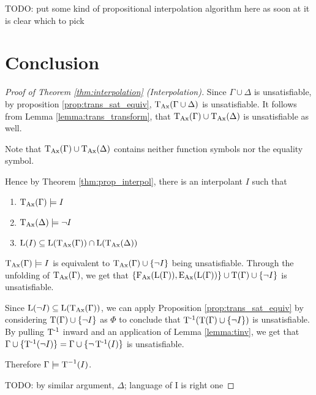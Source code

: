 TODO: put some kind of propositional interpolation algorithm here as soon at it is clear which to pick





\section{Conclusion}

\begin{proof}[Proof of Theorem \ref{thm:interpolation} (Interpolation)]
	Since $\Gamma \cup \Delta$ is unsatisfiable,
	by proposition \ref{prop:trans_sat_equiv}, $\operatorname{\operatorname{T}_{Ax}}(\Gamma \cup \Delta)$ is unsatisfiable.
	It follows from Lemma \ref{lemma:trans_transform}, that $\operatorname{\operatorname{T}_{Ax}}(\Gamma) \cup \operatorname{\operatorname{T}_{Ax}}(\Delta)$ is unsatisfiable as well.


	Note that $\operatorname{\operatorname{T}_{Ax}}(\Gamma) \cup \operatorname{\operatorname{T}_{Ax}}(\Delta)$ contains neither function symbols nor the equality symbol.

	Hence by Theorem \ref{thm:prop_interpol}, there is an interpolant $I$ such that
	\begin{enumerate}
	\item $\operatorname{\operatorname{T}_{Ax}}(\Gamma) \models I$
	\item $\operatorname{\operatorname{T}_{Ax}}(\Delta) \models \lnot I$ 
	\item $\operatorname{L}(I) \subseteq \operatorname{L}(\operatorname{\operatorname{T}_{Ax}}(\Gamma)) \cap \operatorname{L}(\operatorname{\operatorname{T}_{Ax}}(\Delta))$
	\end{enumerate}

	$\operatorname{\operatorname{T}_{Ax}}(\Gamma) \models I$ is equivalent to $\operatorname{\operatorname{T}_{Ax}}(\Gamma) \cup \{\lnot I\}$ being unsatisfiable.
	Through the unfolding of $\operatorname{\operatorname{T}_{Ax}}(\Gamma)$, we get that 
	$\{\operatorname{F_{Ax}}(\operatorname{L}(\Gamma)), \operatorname{E_{Ax}}(\operatorname{L}(\Gamma))\} \cup \operatorname{T}(\Gamma) \cup \{\lnot I\}$ is unsatisfiable.

	Since $\operatorname{L}(\lnot I) \subseteq \operatorname{L}(\operatorname{\operatorname{T}_{Ax}}(\Gamma))$, we can apply Proposition \ref{prop:trans_sat_equiv} by considering $\operatorname{T}(\Gamma) \cup \{\lnot I\}$ as $\Phi$ to conclude that $\operatorname{T^{-1}}(\operatorname{T}(\Gamma) \cup \{\lnot I\})$ is unsatisfiable. By pulling $\operatorname{T^{-1}}$ inward and an application of Lemma \ref{lemma:tinv}, we get that $\Gamma \cup \{\operatorname{T^{-1}}(\lnot I)\} = \Gamma \cup \{\lnot \operatorname{T^{-1}}(I)\}$ is unsatisfiable. 

	Therefore $\Gamma \models \operatorname{T}^{-1}(I)$.

	TODO: by similar argument, $\Delta$; language of I is right one
\end{proof}


